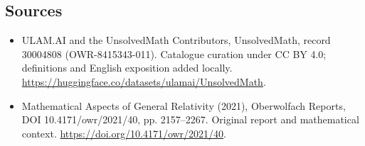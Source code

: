 \documentclass[11pt]{article}
\begin{document}
\subsection{Sources}
\begin{itemize}
\item[\hypertarget{source:30004808:1}{S1}] ULAM.AI and the UnsolvedMath Contributors, UnsolvedMath, record 30004808 (OWR-8415343-011). Catalogue curation under CC BY 4.0; definitions and English exposition added locally.
\url{https://huggingface.co/datasets/ulamai/UnsolvedMath}.
\item[\hypertarget{source:30004808:2}{S2}] Mathematical Aspects of General Relativity (2021), Oberwolfach Reports, DOI 10.4171/owr/2021/40, pp. 2157--2267. Original report and mathematical context.
\url{https://doi.org/10.4171/owr/2021/40}.
\end{itemize}
\label{end:30004808}
\end{document}
